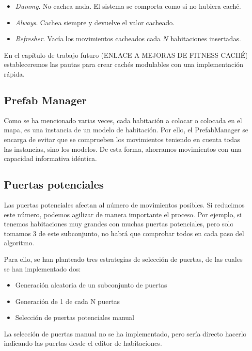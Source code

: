 \begin{itemize}
	\item \emph{Dummy}. No cachea nada. El sistema se comporta como si no hubiera caché.
	\item \emph{Always}. Cachea siempre y devuelve el valor cacheado.
	\item \emph{Refresher}. Vacía los movimientos cacheados cada $N$ habitaciones insertadas.
\end{itemize}

En el capítulo de trabajo futuro (ENLACE A MEJORAS DE FITNESS CACHÉ) estableceremos las pautas para crear cachés modulables con una implementación rápida.

\subsection{Prefab Manager}

Como se ha mencionado varias veces, cada habitación a colocar o colocada en el mapa, es una instancia de un modelo de habitación. Por ello, el PrefabManager se encarga de evitar que se comprueben los movimientos teniendo en cuenta todas las instancias, sino los modelos. De esta forma, ahorramos movimientos con una capacidad informativa idéntica.


\subsection{Puertas potenciales}

Las puertas potenciales afectan al número de movimientos posibles. Si reducimos este número, podemos agilizar de manera importante el proceso. Por ejemplo, si tenemos habitaciones muy grandes con muchas puertas potenciales, pero solo tomamos 3 de este subconjunto, no habrá que comprobar todos en cada paso del algoritmo.

Para ello, se han planteado tres estrategias de selección de puertas, de las cuales se han implementado dos:

\begin{itemize}
	\item Generación aleatoria de un subconjunto de puertas
	\item Generación de 1 de cada N puertas
	\item Selección de puertas potenciales manual
\end{itemize}

La selección de puertas manual no se ha implementado, pero sería directo hacerlo indicando las puertas desde el editor de habitaciones.


